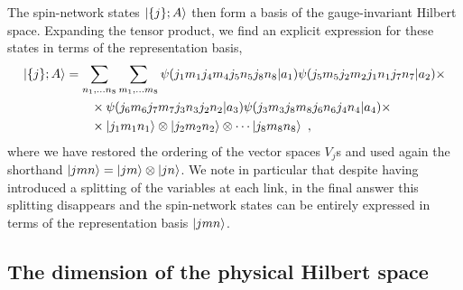 The spin-network states $\ket{ \{j\};A}$ then form a basis of the gauge-invariant Hilbert space.
Expanding the tensor product, we find an explicit expression for these states in terms of the representation basis,
\begin{align}
    \ket{ \{j\};A} &= \sum_{n_1, \ldots n_8} \sum_{m_1, \ldots m_8} \psi\pqty{j_1 m_1 j_4 m_4 j_5 n_5 j_8 n_8 | a_1} \psi\pqty{j_5 m_5 j_2 m_2 j_1 n_1 j_7 n_7 | a_2} \times \\
    &\quad \quad \times \psi\pqty{j_6 m_6 j_7 m_7 j_3 n_3 j_2 n_2 | a_3} \psi\pqty{j_3 m_3 j_8 m_8 j_6 n_6 j_4 n_4 | a_4} \times \\
    &\quad \quad \times \ket{j_1 m_1 n_1} \otimes \ket{j_2 m_2 n_2} \otimes \cdots \ket{j_8 m_8 n_8} \ ,
\end{align}
where we have restored the ordering of the vector spaces $V_j$s and used again the shorthand $\ket{jmn}=\ket{jm}\otimes \ket{jn}$.
We note in particular that despite having introduced a splitting of the variables at each link, in the final answer this splitting disappears and the spin-network states can be entirely expressed in terms of the representation basis $\ket{jmn}$.

\subsection{The dimension of the physical Hilbert space}\label{sec:spin networks dimension}

